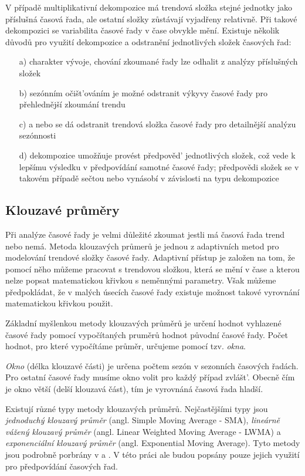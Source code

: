 \documentclass[a4paper,12pt,twoside]{scrreprt}
\begin{document}
V případě multiplikativní dekompozice má trendová složka stejné jednotky jako příslušná časová řada, ale ostatní složky zůstávají vyjadřeny relativně. Při takové dekompozici se variabilita časové řady v čase obvykle mění. Existuje několik důvodů pro využití dekompozice a odstranění jednotlivých složek časových řad:

\begin{itemize}
\item[a)] charakter vývoje, chování zkoumané řady lze odhalit z analýzy příslušných složek
\item[b)] sezónním očišt'ováním je možné odstranit výkyvy časové řady pro přehlednější zkoumání trendu
\item[c)] a nebo se dá odstranit trendová složka časové řady pro detailnější analýzu sezónnosti
\item[d)] dekompozice umožňuje provést předpověd' jednotlivých složek, což vede k lepšímu výsledku v předpovídání samotné časové řady; předpovědi složek se v takovém případě sečtou nebo vynásobí v závislosti na typu dekompozice
\end{itemize}

\subsection{Klouzavé průměry}

Při analýze časové řady je velmi důležité zkoumat jestli má časová řada trend nebo nemá. Metoda klouzavých průmerů je jednou z adaptivních metod pro modelování trendové složky časové řady. Adaptivní přístup je založen na tom, že pomocí něho můžeme pracovat s trendovou složkou, která se mění v čase a kterou nelze popsat matematickou křivkou s neměnnými parametry. Však můžeme předpokládat, že v malých úsecích časové řady existuje možnost takové vyrovnání matematickou křivkou použit. \cite{cipra}

Základní myšlenkou metody klouzavých průměrů je určení hodnot vyhlazené časové řady pomocí vypočítaných pruměrů hodnot původní časové řady. Počet hodnot, pro které vypočítáme průměr, určujeme pomocí tzv. \textit{okna}.   

\textit{Okno} (délka klouzavé části) je určena počtem sezón v sezonních časových řadách. Pro ostatní časové řady musíme okno volit pro každý případ zvlášt'. Obecně čím je okno větší (delší klouzavá část), tím je vyrovnáná časová řada hladší. \cite{arlt}

Existují různé typy metody klouzavých průměrů. Nejčastějšími typy jsou \textit{jednoduchý klouzavý průměr} (angl. Simple Moving Average - SMA), \textit{lineárně vážený klouzavý průměr} (angl. Linear Weighted Moving Average - LWMA) a  \textit{exponenciální klouzavý průměr} (angl. Exponential Moving Average). Tyto metody jsou podrobně porbrány v \cite{arlt} a \cite{iastat}. V této práci ale budou popsány pouze jejich využití pro předpovídání časových řad.
\end{document}
